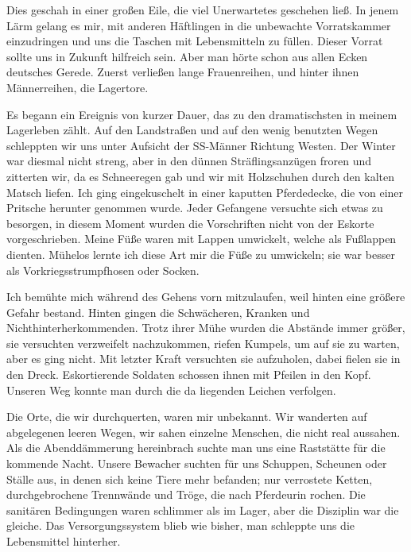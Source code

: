 \documentclass[a4paper,12pt,ngerman,
]{nisebook}
\begin{document}
Dies geschah in einer großen Eile, die viel Unerwartetes geschehen ließ. In jenem Lärm gelang es mir, mit anderen Häftlingen in die unbewachte Vorratskammer einzudringen und uns die Taschen mit Lebensmitteln zu füllen. Dieser Vorrat sollte uns in Zukunft hilfreich sein. Aber man hörte schon aus allen Ecken deutsches Gerede. Zuerst verließen lange Frauenreihen, und hinter ihnen Männerreihen, die Lagertore.

Es begann ein Ereignis von kurzer Dauer, das zu den dramatischsten in meinem Lagerleben zählt. Auf den Landstraßen und auf den wenig benutzten Wegen schleppten wir uns unter Aufsicht der SS-Männer Richtung Westen. Der Winter war diesmal nicht streng, aber in den dünnen Sträflingsanzügen froren und zitterten wir, da es Schneeregen gab und wir mit Holzschuhen durch den kalten Matsch liefen. Ich ging eingekuschelt in einer kaputten Pferdedecke, die von einer Pritsche herunter genommen wurde. Jeder Gefangene versuchte sich etwas zu besorgen, in diesem Moment wurden die Vorschriften nicht von der Eskorte vorgeschrieben. Meine Füße waren mit Lappen umwickelt, welche als Fußlappen dienten. Mühelos lernte ich diese Art mir die Füße zu umwickeln; sie war besser als Vorkriegsstrumpfhosen oder Socken.

Ich bemühte mich während des Gehens vorn mitzulaufen, weil hinten eine größere Gefahr bestand. Hinten gingen die Schwächeren, Kranken und Nichthinterherkommenden. Trotz ihrer Mühe wurden die Abstände immer größer, sie versuchten verzweifelt nachzukommen, riefen Kumpels, um auf sie zu warten, aber es ging nicht. Mit letzter Kraft versuchten sie aufzuholen, dabei fielen sie in den Dreck. Eskortierende Soldaten schossen ihnen mit Pfeilen in den Kopf. Unseren Weg konnte man durch die da liegenden Leichen verfolgen.

Die Orte, die wir durchquerten, waren mir unbekannt. Wir wanderten auf abgelegenen leeren Wegen, wir sahen einzelne Menschen, die nicht real aussahen. Als die Abenddämmerung hereinbrach suchte man uns eine Raststätte für die kommende Nacht. Unsere Bewacher suchten für uns Schuppen, Scheunen oder Ställe aus, in denen sich keine Tiere mehr befanden; nur verrostete Ketten, durchgebrochene Trennwände und Tröge, die nach Pferdeurin rochen. Die sanitären Bedingungen waren schlimmer als im Lager, aber die Disziplin war die gleiche. Das Versorgungssystem blieb wie bisher, man schleppte uns die Lebensmittel hinterher.
\end{document}
